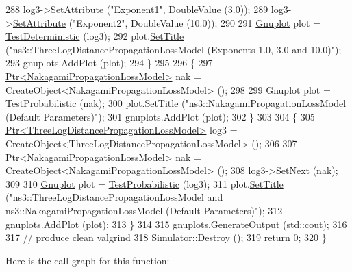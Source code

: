 \begin{DoxyCode}
288     log3->\hyperlink{classns3_1_1ObjectBase_ac60245d3ea4123bbc9b1d391f1f6592f}{SetAttribute} (\textcolor{stringliteral}{"Exponent1"}, DoubleValue (3.0));
289     log3->\hyperlink{classns3_1_1ObjectBase_ac60245d3ea4123bbc9b1d391f1f6592f}{SetAttribute} (\textcolor{stringliteral}{"Exponent2"}, DoubleValue (10.0));
290 
291     \hyperlink{classns3_1_1Gnuplot}{Gnuplot} plot = \hyperlink{main-propagation-loss_8cc_a4e5137292d7c72e9726190680c642e7d}{TestDeterministic} (log3);
292     plot.\hyperlink{classns3_1_1Gnuplot_ac01f15633d49f0239f8a45293a1e04f0}{SetTitle} (\textcolor{stringliteral}{"ns3::ThreeLogDistancePropagationLossModel (Exponents 1.0, 3.0 and 10.0)"});
293     gnuplots.AddPlot (plot);
294   \}
295 
296   \{
297     \hyperlink{classns3_1_1Ptr}{Ptr<NakagamiPropagationLossModel>} nak = 
      CreateObject<NakagamiPropagationLossModel> ();
298 
299     \hyperlink{classns3_1_1Gnuplot}{Gnuplot} plot = \hyperlink{main-propagation-loss_8cc_a2c280e21b5e273cca8f71b0f167e034f}{TestProbabilistic} (nak);
300     plot.SetTitle (\textcolor{stringliteral}{"ns3::NakagamiPropagationLossModel (Default Parameters)"});
301     gnuplots.AddPlot (plot);
302   \}
303 
304   \{
305     \hyperlink{classns3_1_1Ptr}{Ptr<ThreeLogDistancePropagationLossModel>} log3 = 
      CreateObject<ThreeLogDistancePropagationLossModel> ();
306 
307     \hyperlink{classns3_1_1Ptr}{Ptr<NakagamiPropagationLossModel>} nak = 
      CreateObject<NakagamiPropagationLossModel> ();
308     log3->\hyperlink{classns3_1_1PropagationLossModel_ac6d627f2eb09daa057de080615ac1013}{SetNext} (nak);
309 
310     \hyperlink{classns3_1_1Gnuplot}{Gnuplot} plot = \hyperlink{main-propagation-loss_8cc_a2c280e21b5e273cca8f71b0f167e034f}{TestProbabilistic} (log3);
311     plot.\hyperlink{classns3_1_1Gnuplot_ac01f15633d49f0239f8a45293a1e04f0}{SetTitle} (\textcolor{stringliteral}{"ns3::ThreeLogDistancePropagationLossModel and ns3::NakagamiPropagationLossModel
       (Default Parameters)"});
312     gnuplots.AddPlot (plot);
313   \}
314 
315   gnuplots.GenerateOutput (std::cout);
316 
317   \textcolor{comment}{// produce clean valgrind}
318   Simulator::Destroy ();
319   \textcolor{keywordflow}{return} 0;
320 \}
\end{DoxyCode}


Here is the call graph for this function\+:


